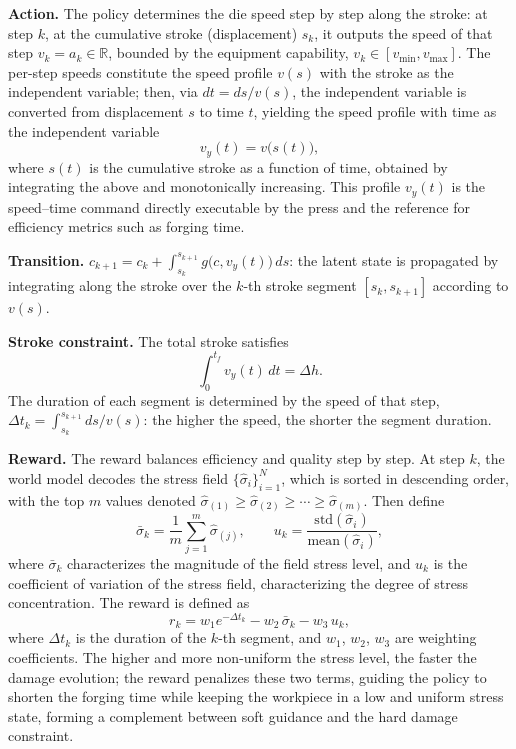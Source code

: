 \textbf{Action.} The policy determines the die speed step by step along the stroke: at step $k$, at the cumulative stroke (displacement) $s_k$, it outputs the speed of that step $v_k=a_k\in\mathbb{R}$, bounded by the equipment capability, $v_k\in[v_{\min},v_{\max}]$. The per-step speeds constitute the speed profile $v(s)$ with the stroke as the independent variable; then, via $dt=ds/v(s)$, the independent variable is converted from displacement $s$ to time $t$, yielding the speed profile with time as the independent variable
\begin{equation}
v_y(t)=v\big(s(t)\big),
\end{equation}
where $s(t)$ is the cumulative stroke as a function of time, obtained by integrating the above and monotonically increasing. This profile $v_y(t)$ is the speed--time command directly executable by the press and the reference for efficiency metrics such as forging time.

\textbf{Transition.} $c_{k+1}=c_k+\int_{s_k}^{s_{k+1}}g\big(c,v_y(t)\big)\,ds$: the latent state is propagated by integrating along the stroke over the $k$-th stroke segment $[s_k,s_{k+1}]$ according to $v(s)$.

\textbf{Stroke constraint.} The total stroke satisfies
\begin{equation}
\int_{0}^{t_f}v_y(t)\,dt=\Delta h .
\end{equation}
The duration of each segment is determined by the speed of that step, $\Delta t_k=\int_{s_k}^{s_{k+1}}ds/v(s)$: the higher the speed, the shorter the segment duration.

\textbf{Reward.} The reward balances efficiency and quality step by step. At step $k$, the world model decodes the stress field $\{\hat{\sigma}_i\}_{i=1}^{N}$, which is sorted in descending order, with the top $m$ values denoted $\hat{\sigma}_{(1)}\ge\hat{\sigma}_{(2)}\ge\cdots\ge\hat{\sigma}_{(m)}$. Then define
\begin{equation}
\bar{\sigma}_k=\frac{1}{m}\sum_{j=1}^{m}\hat{\sigma}_{(j)},\qquad
u_k=\frac{\mathrm{std}(\hat{\sigma}_i)}{\mathrm{mean}(\hat{\sigma}_i)},
\end{equation}
where $\bar{\sigma}_k$ characterizes the magnitude of the field stress level, and $u_k$ is the coefficient of variation of the stress field, characterizing the degree of stress concentration. The reward is defined as
\begin{equation}
r_k=w_1 e^{-\Delta t_k}-w_2\,\bar{\sigma}_k-w_3\,u_k,
\end{equation}
where $\Delta t_k$ is the duration of the $k$-th segment, and $w_1$, $w_2$, $w_3$ are weighting coefficients. The higher and more non-uniform the stress level, the faster the damage evolution; the reward penalizes these two terms, guiding the policy to shorten the forging time while keeping the workpiece in a low and uniform stress state, forming a complement between soft guidance and the hard damage constraint.

